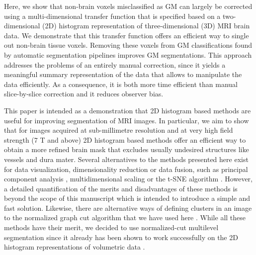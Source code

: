 Here, we show that non-brain voxels misclassified as GM can largely be corrected using a multi-dimensional transfer function that is specified based on a two-dimensional (2D) histogram representation \cite{Kindlmann1998, Kniss2001, Kniss2005, Ip2012} of three-dimensional (3D) MRI brain data. We demonstrate that this transfer function offers an efficient way to single out non-brain tissue voxels. Removing these voxels from GM classifications found by automatic segmentation pipelines improves GM segmentations. This approach addresses the problems of an entirely manual correction, since it yields a meaningful summary representation of the data that allows to manipulate the data efficiently. As a consequence, it is both more time efficient than manual slice-by-slice correction and it reduces observer bias.

This paper is intended as a demonstration that 2D histogram based methods are useful for improving segmentation of MRI images. In particular, we aim to show that for images acquired at sub-millimetre resolution and at very high field strength (7 T and above) 2D histogram based methods offer an efficient way to obtain a more refined brain mask that excludes usually undesired structures like vessels and dura mater. Several alternatives to the methods presented here exist for data visualization, dimensionality reduction or data fusion, such as principal component analysis \cite{PCA2002}, multidimensional scaling \cite{MDS2005} or the t-SNE algorithm \cite{VanDerMaaten2008}. However, a detailed quantification of the merits and disadvantages of these methods is beyond the scope of this manuscript which is intended to introduce a simple and fast solution. Likewise, there are alternative ways of defining clusters in an image to the normalized graph cut algorithm that we have used here \cite{Venkataraju2009, Jain2011, Liu2012, NunezIglesias2013}. While all these methods have their merit, we decided to use normalized-cut multilevel segmentation since it already has been shown to work successfully on the 2D histogram representations of volumetric data \cite{Ip2012}.

